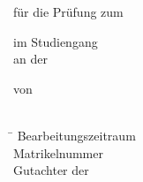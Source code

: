 \thispagestyle{empty}


\DHBWLogo
\vspace{2cm}


\begin{center}
\LARGE{\textbf{\AusarbeitungThema}}
\vspace{0.25cm}

\Large{\textbf{\AusarbeitungBezeichnung}}
\vspace{0.25cm}

für die Prüfung zum \\
\AutorAngestrebterAbschluss
\vspace{0.25cm}

im Studiengang \AutorStudiengang \\
an der \DHBW
\vspace{0.25cm}

von\\
\textbf{\AutorVorname\ \AutorNachname} \\
\AusarbeitungAbgabeDatum

\end{center}
\vspace{0.5cm}


\begin{tabbing}
\hspace{8cm} \= \kill
Bearbeitungszeitraum \> \AusarbeitungZeitraum\\
Matrikelnummer \> \AutorMatrNr\\
Gutachter der \DHBW \> \BetreuerDHBW
\end{tabbing}

\clearpage